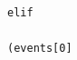 \documentclass[10pt,a4paper]{article} %
\begin{document}
\begin{lstlisting}
                                                                                                                                                                                                                                                                                                                                                                                                                                                                                                                                                                                                                                                                                                                                                                                                                                                                                                                                                                                                                                                                                                                                                                                                    elif
                                                                                                                                                                                                                                                                                                                                                                                                                                                                                                                                                                                                                                                                                                                                                                                                                                                                                                                                                                                                                                                                                                                                                                                                    (events[0]

\end{lstlisting}
\end{document}
